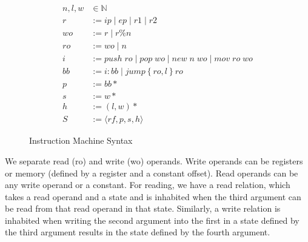 \begin{figure}
\begin{align}
n, l, w &\in \mathbb{N} \tag{Machine Word} \\
r &:= ip \; | \; ep \; | \; r1 \; | \; r2 \tag{Registers} \\
wo &:= r \; | \; r \% n \tag{Write Operands} \\
ro &:= wo \; | \; n \tag{Read Operands} \\
i &:= \mathit{push} \; ro \; | \; \mathit{pop} \; wo \; | \; \mathit{new} \; n
\; wo \; | \; \mathit{mov} \; ro \; wo \tag{Instructions} \\
bb &:= i : bb \; | \; \mathit{jump} \left\{ro, l\right\} ro \tag{Basic Block} \\
p &:= bb* \tag{Program} \\
s &:= w* \tag{Stack} \\
h &:= \left(l, w\right)* \tag{Heap}\\
S &:= \langle rf, p, s, h \rangle \tag{State} 
\end{align}
\caption{Instruction Machine Syntax}
\label{fig:im_syntax}
\end{figure}

We separate read (ro) and write (wo) operands. Write operands can be registers
or memory (defined by a register and a constant offset). Read operands can be
any write operand or a constant. For reading, we have a read relation, which
takes a read operand and a state and is inhabited when the third argument can be
read from that read operand in that state. Similarly, a write relation is
inhabited when writing the second argument into the first in a state defined by
the third argument results in the state defined by the fourth argument.  

